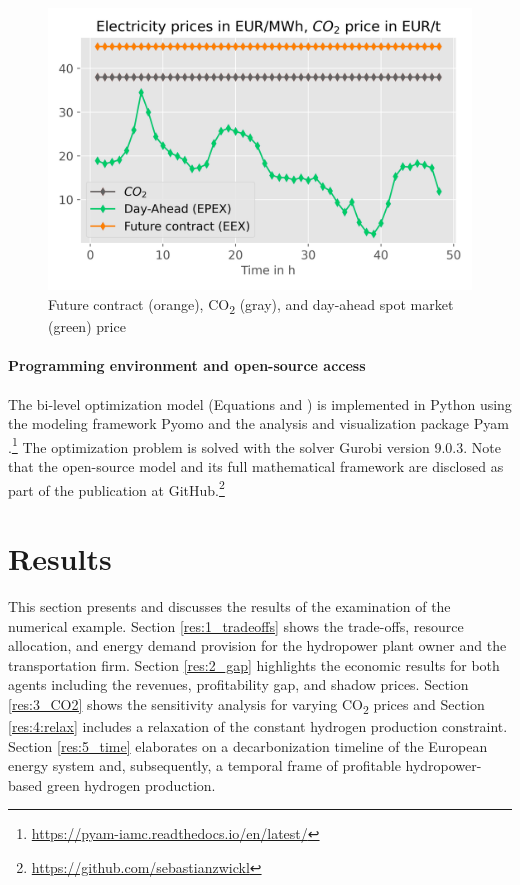 \documentclass[review]{elsarticle}
\begin{document}
\begin{figure}[h]
	\centering
	\includegraphics[width=0.75\linewidth]{figures/numerical_example_prices.png}
	\caption{Future contract (orange), CO\textsubscript{2} (gray), and day-ahead spot market (green) price}
	\label{fig:prices}
\end{figure}

\paragraph{Programming environment and open-source access} The bi-level optimization model (Equations  and ) is implemented in Python using the modeling framework Pyomo \cite{hart2017optimization} and the analysis and visualization package Pyam \cite{gidden2019pyam}.\footnote{\url{https://pyam-iamc.readthedocs.io/en/latest/}} The optimization problem is solved with the solver Gurobi version 9.0.3. Note that the open-source model and its full mathematical framework are disclosed as part of the publication at GitHub.\footnote{\url{https://github.com/sebastianzwickl}} 
\newpage
\section{Results}\label{results}
This section presents and discusses the results of the examination of the numerical example. Section \ref{res:1_tradeoffs} shows the trade-offs, resource allocation, and energy demand provision for the hydropower plant owner and the transportation firm. Section \ref{res:2_gap} highlights the economic results for both agents including the revenues, profitability gap, and shadow prices. Section \ref{res:3_CO2} shows the sensitivity analysis for varying CO\textsubscript{2} prices and Section \ref{res:4:relax} includes a relaxation of the constant hydrogen production constraint. Section \ref{res:5_time} elaborates on a decarbonization timeline of the European energy system and, subsequently, a temporal frame of profitable hydropower-based green hydrogen production.
\end{document}
